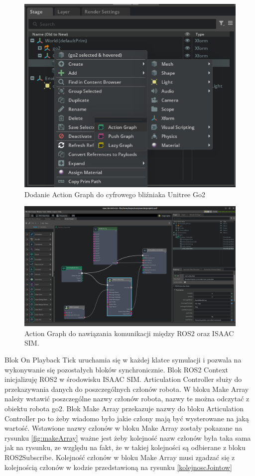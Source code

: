 \documentclass[12pt]{article}
\begin{document}
\begin{figure}[h]
    \centering
    \includegraphics[width=0.7\linewidth]{Zdjęcia/dodanieActionGraph.png}
    \caption{Dodanie Action Graph do cyfrowego bliźniaka Unitree Go2}
    \label{fig:jakDodacAction}
\end{figure}

\clearpage

\begin{figure}[h]
    \centering
    \includegraphics[width=0.75\linewidth]{Zdjęcia/actionGraph.png}
    \caption{Action Graph do nawiązania komunikacji między ROS2 oraz ISAAC SIM.}
    \label{fig:actionGraph}
\end{figure}


Blok On Playback Tick uruchamia się w każdej klatce symulacji i pozwala na wykonywanie się pozostałych bloków synchronicznie. Blok ROS2 Context inicjalizuję ROS2 w środowisku ISAAC SIM. Articulation Controller służy do przekazywania danych do poszczególnych członów robota. W bloku Make Array należy wstawić poszczególne nazwy członów robota, nazwy te można odczytać z obiektu robota go2. Blok Make Array przekazuje nazwy do bloku Articulation Controller po to żeby wiadomo było jakie człony mają być wysterowane na jaką wartość. Wstawione nazwy członów w bloku Make Array zostały pokazane na rysunku \ref{fig:makeArray} ważne jest żeby kolejność nazw członów była taka sama jak na rysunku, ze względu na fakt, że w takiej kolejności są odbierane z bloku ROS2Subscribe. Kolejność członów w bloku Make Array musi zgadzać się z kolejnością członów w kodzie przedstawioną na rysunku \ref{kolejnoscJointow}
\end{document}
